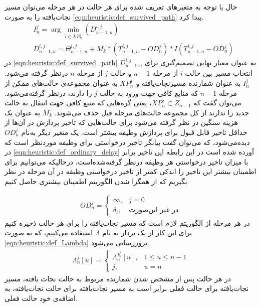 	حال با توجه به متغیرهای تعریف شده برای هر حالت در هر مرحله می‌توان مسیر نجات‌یافته را به صورت \cref{eqn:heuristic:def_survived_path} پیدا کرد. 
	\begin{align}\label{eqn:heuristic:def_survived_path}
		&I_n^j = \arg \min_{i \in XP_n^j} (D_{n-1,n}^{i,j}) \\
		&D_{n-1,n}^{i,j} = \Theta_{n-1,n}^{i,j} + M_k * (T_{n-1,n}^{i,j} - OD_n^j) * I(T_{n-1,n}^{i,j} - OD_n^j)
	\end{align}	
در \cref{eqn:heuristic:def_survived_path} $D_{n-1,n}^{i,j}$ به عنوان معیار نهایی تصمیم‌گیری برای انتخاب مسیر بین حالت $i$ از مرحله $n-1$ و حالت $j$ از مرحله $n$ درنظر گرفته می‌شود. $I_n^j$ به عنوان شمارنده مسیرنجات‌یافته و $XP_n^j$ به عنوان مجموعه‌ی حالت‌های ممکن از مرحله $n-1$ که منابع کافی جهت ورود به حالت $j$ را دارند، درنظر گرفته‌می‌شود. می‌توان گفت که $XP_n^j \subset Z_{n-1}$، یعنی گره‌هایی که منبع کافی جهت انتقال به حالت جدید را ندارند از کل مجموعه حالت‌های مرحله قبل حذف می‌شوند. $M_k$ به عنوان یک هزینه سنگین در نظر گرفته می‌شود برای حالت‌هایی که تاخیر پردازش در آن‌ها از حداقل تاخیر قابل قبول برای پردازش وظیفه بیشتر است. یک متغیر دیگر به‌نام $OD_n^j$ دیده‌می‌شود، که می‌توان گفت بیانگر تاخیر درخواستی برای وظیفه موردنظر است که در \cref{eqn:heuristic:def_ordinary_delay} آورده شده است در این رابطه این تاخیر برابر با میزان تاخیر درخواستی هر وظیفه درنظر گرفته‌شده‌است، درحالیکه می‌توانیم برای اطمینان بیشتر این تاخیر را اندکی کمتر از تاخیر درخواستی وظیفه در آن مرحله در نظر بگیریم که از همگرا شدن الگوریتم اطمینان بیشتری حاصل کنیم. 

	\begin{align}\label{eqn:heuristic:def_ordinary_delay}
		OD_n^j = 
		\begin{cases}
			\infty, & \text{$j = 0$} \\
			\delta_t,& \text{در غیر این‌صورت}
		\end{cases}
	\end{align}
	در هر مرحله از الگوریتم لازم است که مسیر نجات‌یافته را برای هر حالت ذخیره کنیم برای این کار از یک بردار به نام $\Lambda$ استفاده می‌کنیم، که به صورت \cref{eqn:heuristic:def_Lambda} بروزرسانی می‌شود. 
	\begin{align}\label{eqn:heuristic:def_Lambda}
		\Lambda_n^j[u] = 
		\begin{cases}
			\Lambda_n^{I_n^j}[u], & 1 \le u \le n-1 \\
			j, 				& u = n
		\end{cases}
	\end{align}
	در هر حالت پس از مشخص شدن شمارنده مربوط به حالت نجات یافته، مسیر نجات‌یافته برای حالت فعلی برابر است به مسیر نجات‌یافته برای حالت نجات‌یافته، به اضافه‌ی خود حالت فعلی. 

